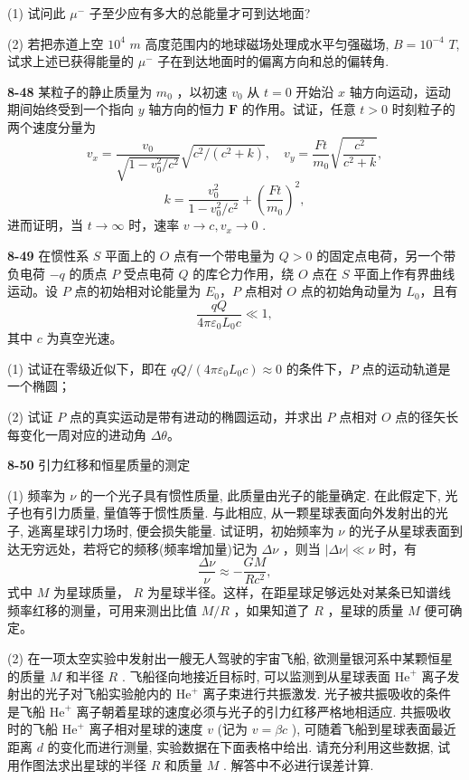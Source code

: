 (1) 试问此 $\mu^{-}$ 子至少应有多大的总能量才可到达地面?

(2) 若把赤道上空 $10^{4}$ $m$ 高度范围内的地球磁场处理成水平匀强磁场, $B=10^{-4}$ $T$, 试求上述已获得能量的 $\mu^{-}$ 子在到达地面时的偏离方向和总的偏转角.

\newpage

\textbf{8-48} 某粒子的静止质量为 $m_0$ ，以初速 $v_0$ 从 $t = 0$ 开始沿 $x$ 轴方向运动，运动期间始终受到一个指向 $y$ 轴方向的恒力 $\pmb{F}$ 的作用。试证，任意 $t > 0$ 时刻粒子的两个速度分量为
\[
v _ {x} = \frac {v _ {0}}{\sqrt {1 - v _ {0} ^ {2} / c ^ {2}}} \sqrt {c ^ {2} / (c ^ {2} + k)}, \quad v _ {y} = \frac {F t}{m _ {0}} \sqrt {\frac {c ^ {2}}{c ^ {2} + k}},
\]
\[
k = \frac {v _ {0} ^ {2}}{1 - v _ {0} ^ {2} / c ^ {2}} + \left(\frac {F t}{m _ {0}}\right) ^ {2},
\]
进而证明，当 $t \to \infty$ 时，速率 $v \to c, v_x \to 0$ .

\newpage

\textbf{8-49} 在惯性系 $S$ 平面上的 $O$ 点有一个带电量为 $Q>0$ 的固定点电荷，另一个带负电荷 $-q$ 的质点 $P$ 受点电荷 $Q$ 的库仑力作用，绕 $O$ 点在 $S$ 平面上作有界曲线运动。设 $P$ 点的初始相对论能量为 $E_0$，$P$ 点相对 $O$ 点的初始角动量为 $L_0$，且有
\[
\frac{qQ}{4\pi\varepsilon_0 L_0c}\ll1,
\]
其中 $c$ 为真空光速。

(1) 试证在零级近似下，即在 $qQ/(4\pi\varepsilon_0L_0c)\approx0$ 的条件下，$P$ 点的运动轨道是一个椭圆；

(2) 试证 $P$ 点的真实运动是带有进动的椭圆运动，并求出 $P$ 点相对 $O$ 点的径矢长每变化一周对应的进动角 $\Delta\theta$。

\newpage

\textbf{8-50} 引力红移和恒星质量的测定

(1) 频率为 $\nu$ 的一个光子具有惯性质量, 此质量由光子的能量确定. 在此假定下, 光子也有引力质量, 量值等于惯性质量. 与此相应, 从一颗星球表面向外发射出的光子, 逃离星球引力场时, 便会损失能量.
试证明，初始频率为 $\nu$ 的光子从星球表面到达无穷远处，若将它的频移(频率增加量)记为 $\Delta \nu$ ，则当 $|\Delta \nu| \ll \nu$ 时，有
\[
\frac {\Delta \nu}{\nu} \approx - \frac {G M}{R c ^ {2}},
\]
式中 $M$ 为星球质量， $R$ 为星球半径。这样，在距星球足够远处对某条已知谱线频率红移的测量，可用来测出比值 $M / R$ ，如果知道了 $R$ ，星球的质量 $M$ 便可确定。

(2) 在一项太空实验中发射出一艘无人驾驶的宇宙飞船, 欲测量银河系中某颗恒星的质量 $M$ 和半径 $R$ . 飞船径向地接近目标时, 可以监测到从星球表面 $\mathrm{He}^{+}$ 离子发射出的光子对飞船实验舱内的 $\mathrm{He}^{+}$ 离子束进行共振激发. 光子被共振吸收的条件是飞船 $\mathrm{He}^{+}$ 离子朝着星球的速度必须与光子的引力红移严格地相适应. 共振吸收时的飞船 $\mathrm{He}^{+}$ 离子相对星球的速度 $v$ (记为 $v = \beta c$ ), 可随着飞船到星球表面最近距离 $d$ 的变化而进行测量, 实验数据在下面表格中给出. 请充分利用这些数据, 试用作图法求出星球的半径 $R$ 和质量 $M$ . 解答中不必进行误差计算.

